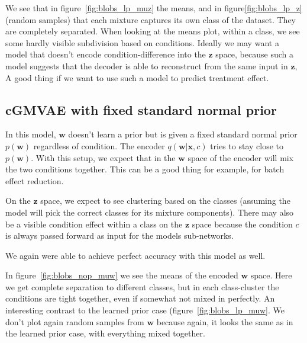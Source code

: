 \documentclass[11pt, a4paper]{report}
\theoremstyle{plain}
\theoremstyle{definition}
\theoremstyle{remark}
\newcommand{\x}{\mathbf{x}}
\newcommand{\z}{\mathbf{z}}
\newcommand{\w}{\mathbf{w}}
\begin{document}
We see that in figure~\ref{fig:blobs_lp_muz} the means, and in
figure\ref{fig:blobs_lp_z} (random samples) that each mixture captures its own
class of the dataset. They are completely separated. When looking at the means
plot, within a class, we
see some hardly visible subdivision based on conditions.
Ideally we may want a model that doesn't encode condition-difference into the
$\z$ space, because such a model 
suggests that the decoder is able to reconstruct from the same input in $\z$,
A good thing if we want to use such a
model to predict treatment effect.

\subsection{cGMVAE with fixed standard normal prior}

In this model, $\w$ doesn't learn a prior but is given a fixed standard normal
prior $p(\w)$ regardless of condition.
The encoder $q(\w | \x, c)$ 
tries to stay close to $p(\w)$.
With this setup, we expect that in the $\w$ space of the 
encoder will mix the two conditions together. This can be a good thing for
example, for batch effect reduction.

On the $\z$ space, we expect to see clustering based on the classes (assuming
the model will pick the correct classes for its mixture components).
There may also be a visible condition effect within a class on the $\z$ space
because the condition $c$ is always passed forward as input for the models
sub-networks.

We again were able to achieve perfect accuracy with this model as well.

In figure~\ref{fig:blobs_nop_muw} we see the means of the encoded $\w$ space.
Here we get complete separation to different classes, but in each class-cluster
the conditions are tight together, even if somewhat not mixed in perfectly.
An interesting contrast to the learned prior case
(figure~\ref{fig:blobs_lp_muw}.
We don't plot again random samples from $\w$ because again, it looks the same 
as in the learned prior case, with everything mixed together.
\end{document}
